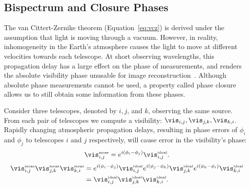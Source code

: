 

\vspace{-.1in}
\subsection{Bispectrum and Closure Phases }
\label{sec:bispec}


The van Cittert-Zernike theorem (Equation~\ref{eq:vcz}) is derived under the assumption that light is moving through a vacuum. 
However, in reality, inhomogeneity in the Earth's atmosphere causes the light to move at different velocities towards each telescope. At short observing wavelengths, this propagation delay has a large effect on the phase of measurements, and renders the absolute visibility phase unusable for image reconstruction~\cite{monnier2013radio}. Although absolute phase measurements cannot be used, a property called phase closure allows us to still obtain some information from these phases. 

Consider three telescopes, denoted by $i, j$, and $k$, observing the same source. From each pair of telescopes we compute a visibility: $\vis_{i,j}, \vis_{j,k}, \vis_{k,i}$. Rapidly changing atmospheric propagation delays, resulting in phase errors of $\phi_i$ and $\phi_j$ to telescopes $i$ and $j$ respectively, will cause error in the visibility's phase: 
\begin{equation} \vis_{i,j}^{\mbox{\tiny{meas}}} = e^{i(\phi_i - \phi_j)}\vis_{i,j}^{\mbox{\tiny{ideal}}}. 
\end{equation}
\begin{align}  
\notag \vis^{\mbox{\tiny{meas}}}_{i,j}\vis^{\mbox{\tiny{meas}}}_{j,k}\vis^{\mbox{\tiny{meas}}}_{k,i} &= e^{i(\phi_i-\phi_j)}\vis^{\mbox{\tiny{ideal}}}_{i,j}e^{i(\phi_j-\phi_k)}\vis^{\mbox{\tiny{ideal}}}_{j,k}e^{i(\phi_k-\phi_i)}\vis^{\mbox{\tiny{ideal}}}_{k,i} \\
&=\vis^{\mbox{\tiny{ideal}}}_{i,j}\vis^{\mbox{\tiny{ideal}}}_{j,k}\vis^{\mbox{\tiny{ideal}}}_{k,i}. %
\label{eq:phaseclosure}
 \end{align}

